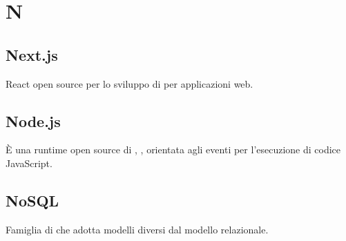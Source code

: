 \section*{N}
\markright{}

\subsection*{Next.js}
 React open source per lo sviluppo di  per applicazioni web. 

\subsection*{Node.js}
È una runtime open source di , , orientata agli eventi per l'esecuzione di codice JavaScript.

\subsection*{NoSQL}
Famiglia di  che adotta modelli diversi dal modello relazionale.